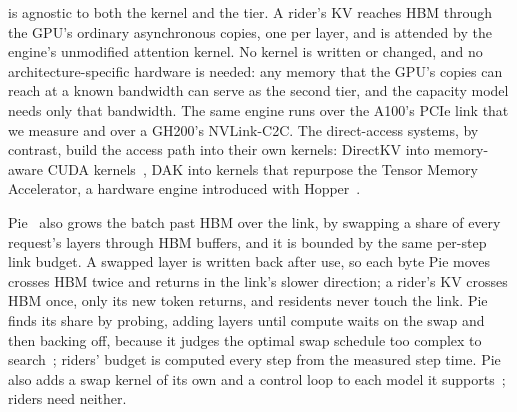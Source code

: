 \sysname{} is agnostic to both the kernel and the tier. A rider's KV reaches
HBM through the GPU's ordinary asynchronous copies, one per layer, and is
attended by the engine's unmodified attention kernel. No kernel is written or
changed, and no architecture-specific hardware is needed: any memory that the
GPU's copies can reach at a known bandwidth can serve as the second tier, and
the capacity model needs only that bandwidth. The same engine runs over the
A100's PCIe link that we measure and over a GH200's NVLink-C2C. The
direct-access systems, by contrast, build the access path into their own
kernels: DirectKV into memory-aware CUDA kernels~\cite{directkv}, DAK into
kernels that repurpose the Tensor Memory Accelerator, a hardware engine
introduced with Hopper~\cite{dak}.

Pie~\cite{pie} also grows the batch past HBM over the link, by swapping a share
of every request's layers through HBM buffers, and it is bounded by the same
per-step link budget. A swapped layer is written back after use, so each byte
Pie moves crosses HBM twice and returns in the link's slower direction; a
rider's KV crosses HBM once, only its new token returns, and residents never
touch the link. Pie finds its share by probing, adding layers until compute
waits on the swap and then backing off, because it judges the optimal swap
schedule too complex to search~\cite{pie}; riders' budget is computed every
step from the measured step time. Pie also adds a swap kernel of its own and
a control loop to each model it supports~\cite{pie}; riders need neither.

